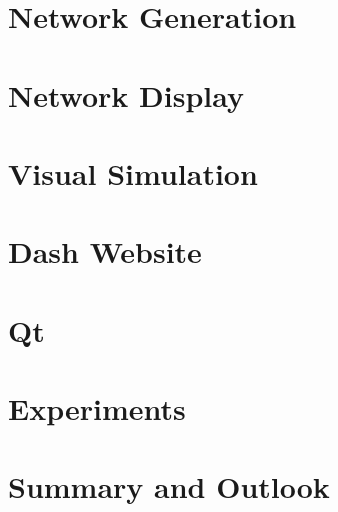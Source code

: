 \documentclass[oneside]{ausarbeitung}
\begin{document}
\chapter{Network Generation}
\label{cha:network_generation}


\chapter{Network Display}
\label{cha:network_display}


\chapter{Visual Simulation}
\label{cha:visual_simulation}


\chapter{Dash Website}
\label{cha:dash_website}


\chapter{Qt}
\label{cha:qt}


\chapter{Experiments}
\label{cha:experiments}


\chapter{Summary and Outlook}
\label{cha:summary}


% 

% 

% 
\end{document}
